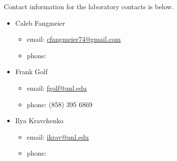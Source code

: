 Contact information for the laboratory contacts is below.

\begin{itemize}
\item Caleb Fangmeier
	\begin{itemize}
	\item email: \href{mailto:cfangmeier74@gmail.com}{cfangmeier74@gmail.com}
	\item phone: 
	\end{itemize}
\item Frank Golf
	\begin{itemize}
	\item email: \href{mailto:fgolf@unl.edu}{fgolf@unl.edu}
	\item phone: (858) 395 6869
	\end{itemize}
\item Ilya Kravchenko
	\begin{itemize}
	\item email: \href{mailto:ikrav@unl.edu}{ikrav@unl.edu}
	\item phone: 
	\end{itemize}	
\end{itemize}